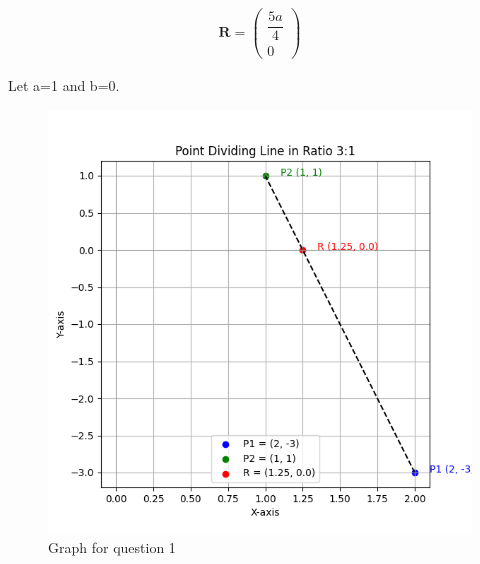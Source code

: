 \documentclass[journal]{IEEEtran}
\renewcommand{\vec}[1]{\mathbf{#1}}
\newcommand{\brak}[1]{\begin{pmatrix}#1\end{pmatrix}}
\begin{document}
\begin{align}
\boxed{\,\vec{R} = \brak{\dfrac{5a}{4}\\0}\,}
\end{align}

Let a=1 and b=0.

\begin{figure}[ht!]
\centering
\includegraphics[height=0.5\textheight, keepaspectratio]{figs/q1.png}
\caption{Graph for question 1}
\end{figure}
\end{document}

